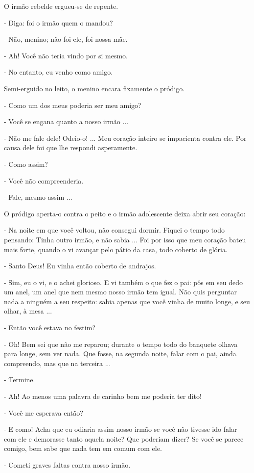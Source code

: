 O irmão rebelde ergueu-se de repente.

- Diga: foi o irmão quem o mandou?

- Não, menino; não foi ele, foi nossa mãe.

- Ah! Você não teria vindo por si mesmo.

- No entanto, eu venho como amigo.

Semi-erguido no leito, o menino encara fixamente o pródigo.

- Como um dos meus poderia ser meu amigo?

- Você se engana quanto a nosso irmão ...

- Não me fale dele! Odeio-o! ... Meu coração inteiro se impacienta
contra ele. Por causa dele foi que lhe respondi asperamente.

- Como assim?

- Você não compreenderia.

- Fale, mesmo assim ...

O pródigo aperta-o contra o peito e o irmão adolescente deixa abrir seu
coração:

- Na noite em que você voltou, não consegui dormir. Fiquei o tempo todo
pensando: Tinha outro irmão, e não sabia ... Foi por isso que meu
coração bateu mais forte, quando o vi avançar pelo pátio da casa, todo
coberto de glória.

- Santo Deus! Eu vinha então coberto de andrajos.

- Sim, eu o vi, e o achei glorioso. E vi também o que fez o pai: pôs em
seu dedo um anel, um anel que nem mesmo nosso irmão tem igual. Não quis
perguntar nada a ninguém a seu respeito: sabia apenas que você vinha de
muito longe, e seu olhar, à mesa ...

- Então você estava no festim?

- Oh! Bem sei que não me reparou; durante o tempo todo do banquete
olhava para longe, sem ver nada. Que fosse, na segunda noite, falar com
o pai, ainda compreendo, mas que na terceira ...

- Termine.

- Ah! Ao menos uma palavra de carinho bem me poderia ter dito!

- Você me esperava então?

- E como! Acha que eu odiaria assim nosso irmão se você não tivesse ido
falar com ele e demorasse tanto aquela noite? Que poderiam dizer? Se
você se parece comigo, bem sabe que nada tem em comum com ele.

- Cometi graves faltas contra nosso irmão.

